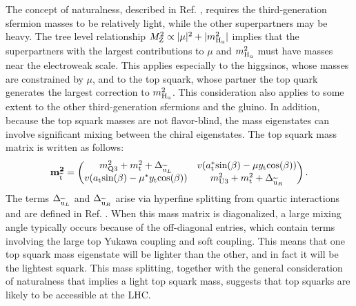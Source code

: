 The concept of naturalness, described in Ref. \cite{NaturalSUSY}, requires the third-generation sfermion masses to be relatively light, while the other superpartners may be heavy. The tree level relationship $M_{\mathrm{Z}}^{2} \propto |\mu|^{2} + |m_{\mathrm{H}_\mathrm{u}}^{2}|$ implies that the superpartners with the largest contributions to $\mu$ and $m_{\mathrm{H}_\mathrm{u}}^{2}$ must have masses near the electroweak scale. This applies especially to the higgsinos, whose masses are constrained by $\mu$, and to the top squark, whose partner the top quark generates the largest correction to $m_{\mathrm{H}_\mathrm{u}}^{2}$. This consideration also applies to some extent to the other third-generation sfermions and the gluino. In addition, because the top squark masses are not flavor-blind, the mass eigenstates can involve significant mixing between the chiral eigenstates. The top squark mass matrix is written as follows:
\begin{equation}
\mathbf{m_{\widetilde{\mathrm{t}}}^{2}} =
\begin{pmatrix}
m_{\mathrm{Q} 3}^{2} + m_{\mathrm{t}}^{2} + \Delta_{\widetilde{\mathrm{u}}_{L}} & v(a_{\mathrm{t}}^{\ast}\text{sin}(\beta) - \mu y_{\mathrm{t}}\text{cos}(\beta)) \\
v(a_{\mathrm{t}}\text{sin}(\beta) - \mu^{\ast} y_{\mathrm{t}}\text{cos}(\beta)) & m_{\mathrm{U} 3}^{2} + m_{\mathrm{t}}^{2} + \Delta_{\widetilde{\mathrm{u}}_{R}}
\end{pmatrix}.
\end{equation}
The terms $\Delta_{\widetilde{\mathrm{u}}_{L}}$ and $\Delta_{\widetilde{\mathrm{u}}_{R}}$ arise via hyperfine splitting from quartic interactions and are defined in Ref. \cite{Primer}. When this mass matrix is diagonalized, a large mixing angle typically occurs because of the off-diagonal entries, which contain terms involving the large top Yukawa coupling and soft coupling. This means that one top squark mass eigenstate will be lighter than the other, and in fact it will be the lightest squark. This mass splitting, together with the general consideration of naturalness that implies a light top squark mass, suggests that top squarks are likely to be accessible at the LHC.

